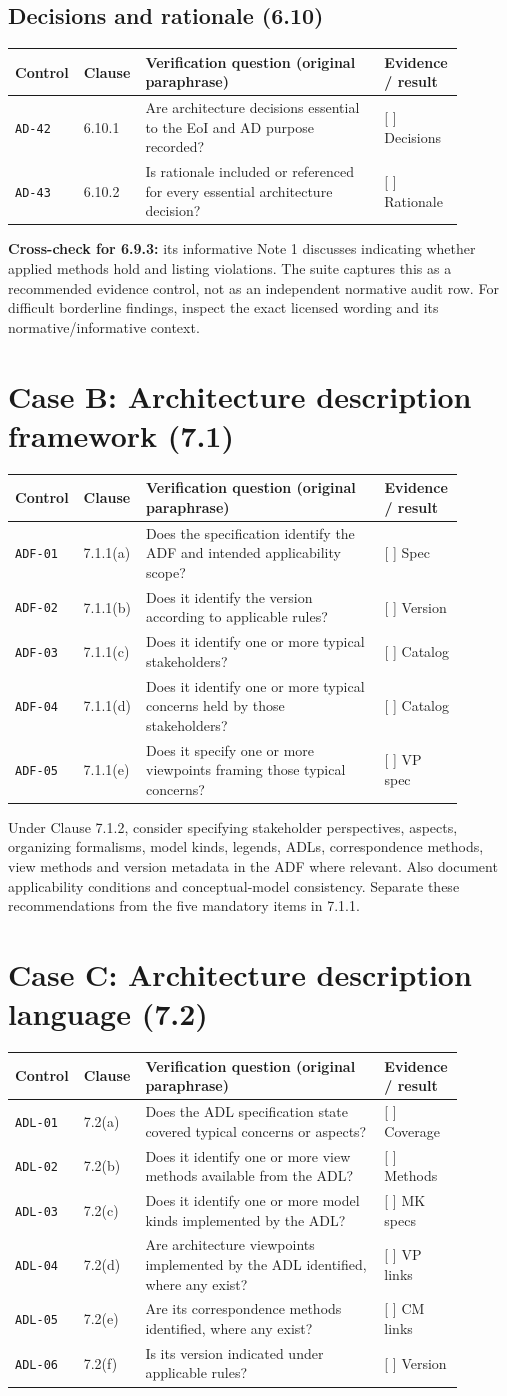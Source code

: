 \documentclass[11pt,letterpaper]{article}
\newcommand{\AuditingHead}{\begin{longtable}{p{0.10\linewidth}p{0.10\linewidth}p{0.52\linewidth}p{0.17\linewidth}}\toprule\textbf{Control}&\textbf{Clause}&\textbf{Verification question (original paraphrase)}&\textbf{Evidence / result}\\\midrule\endhead}
\newcommand{\AuditingEnd}{\bottomrule\end{longtable}}
\newcommand{\AuditRow}[4]{\texttt{#1} & #2 & #3 & #4\\}
\begin{document}
\subsection{Decisions and rationale (6.10)}
\AuditingHead
\AuditRow{AD-42}{6.10.1}{Are architecture decisions essential to the EoI and AD purpose recorded?}{[ ] Decisions}
\AuditRow{AD-43}{6.10.2}{Is rationale included or referenced for every essential architecture decision?}{[ ] Rationale}
\AuditingEnd
\begin{Guidance}\textbf{Cross-check for 6.9.3:} its informative Note 1 discusses indicating whether applied methods hold and listing violations. The suite captures this as a recommended evidence control, not as an independent normative audit row. For difficult borderline findings, inspect the exact licensed wording and its normative/informative context.\end{Guidance}
\section{Case B: Architecture description framework (7.1)}
\AuditingHead
\AuditRow{ADF-01}{7.1.1(a)}{Does the specification identify the ADF and intended applicability scope?}{[ ] Spec}
\AuditRow{ADF-02}{7.1.1(b)}{Does it identify the version according to applicable rules?}{[ ] Version}
\AuditRow{ADF-03}{7.1.1(c)}{Does it identify one or more typical stakeholders?}{[ ] Catalog}
\AuditRow{ADF-04}{7.1.1(d)}{Does it identify one or more typical concerns held by those stakeholders?}{[ ] Catalog}
\AuditRow{ADF-05}{7.1.1(e)}{Does it specify one or more viewpoints framing those typical concerns?}{[ ] VP spec}
\AuditingEnd
\begin{Guidance}\FlagRec{} Under Clause 7.1.2, consider specifying stakeholder perspectives, aspects, organizing formalisms, model kinds, legends, ADLs, correspondence methods, view methods and version metadata in the ADF where relevant. Also document applicability conditions and conceptual-model consistency. Separate these recommendations from the five mandatory items in 7.1.1.\end{Guidance}
\section{Case C: Architecture description language (7.2)}
\AuditingHead
\AuditRow{ADL-01}{7.2(a)}{Does the ADL specification state covered typical concerns or aspects?}{[ ] Coverage}
\AuditRow{ADL-02}{7.2(b)}{Does it identify one or more view methods available from the ADL?}{[ ] Methods}
\AuditRow{ADL-03}{7.2(c)}{Does it identify one or more model kinds implemented by the ADL?}{[ ] MK specs}
\AuditRow{ADL-04}{7.2(d)}{Are architecture viewpoints implemented by the ADL identified, where any exist?}{[ ] VP links}
\AuditRow{ADL-05}{7.2(e)}{Are its correspondence methods identified, where any exist?}{[ ] CM links}
\AuditRow{ADL-06}{7.2(f)}{Is its version indicated under applicable rules?}{[ ] Version}
\AuditingEnd
\end{document}

